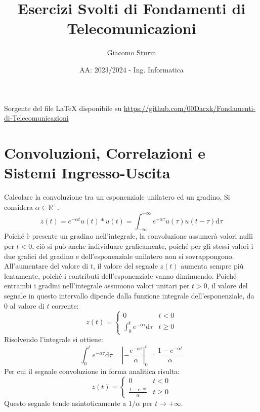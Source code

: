 \documentclass{article}
\title{Esercizi Svolti di Fondamenti di Telecomunicazioni}
\author{Giacomo Sturm}
\date{AA: 2023/2024 - Ing. Informatica}
\newcommand{\df}{\mathrm{d}}
\begin{document}

\pagestyle{fancy}
\fancyhead{}\fancyfoot{}
\fancyfoot[C]{\thepage}

\maketitle

\vspace{10mm}

\begin{center}
    Sorgente del file LaTeX disponibile su \url{https://github.com/00Darxk/Fondamenti-di-Telecomunicazioni}
\end{center}

\clearpage

\tableofcontents

\clearpage


\section{Convoluzioni, Correlazioni e Sistemi Ingresso-Uscita}

Calcolare la convoluzione tra un esponenziale unilatero ed un gradino, 
Si considera $\alpha\in\mathbb{R}^+$. 
\begin{equation*}
    z(t)=e^{-\alpha t}u(t)*u(t)=\displaystyle\int_{-\infty}^{+\infty}e^{-\alpha\tau}u(\tau)u(t-\tau)\df\tau
\end{equation*}
Poiché è presente un gradino nell'integrale, la convoluzione assumerà valori nulli per $t<0$, ciò si può anche individuare graficamente, poiché per gli stessi valori i due 
grafici del gradino e dell'esponenziale unilatero non si sovrappongono. All'aumentare del valore di $t$, il valore del segnale $z(t)$ aumenta sempre più lentamente, poiché i 
contributi dell'esponenziale vanno diminuendo. Poiché entrambi i gradini nell'integrale assumono valori unitari per $t>0$, il valore del segnale in questo intervallo 
dipende dalla funzione integrale dell'esponenziale, da $0$ al valore di $t$ corrente:
\begin{equation*}
    z(t)=\begin{cases}
        0&t<0\\
        \displaystyle\int_0^te^{-\alpha \tau}\df\tau&t\geq0
    \end{cases}
\end{equation*}
Risolvendo l'integrale si ottiene:
\begin{equation*}
    \displaystyle\int_0^te^{-\alpha \tau}\df\tau=\left|-\frac{e^{-\alpha\tau}}{\alpha}\right|^t_0=\frac{1-e^{-\alpha t}}{\alpha}
\end{equation*}
Per cui il segnale convoluzione in forma analitica risulta:
\begin{equation}
    z(t)=\begin{cases}
        0&t<0\\
        \displaystyle\frac{1-e^{-\alpha t}}{\alpha}&t\geq0
    \end{cases}
\end{equation}
Questo segnale tende asintoticamente a $1/\alpha$ per $t\to+\infty$. 
\end{document}
